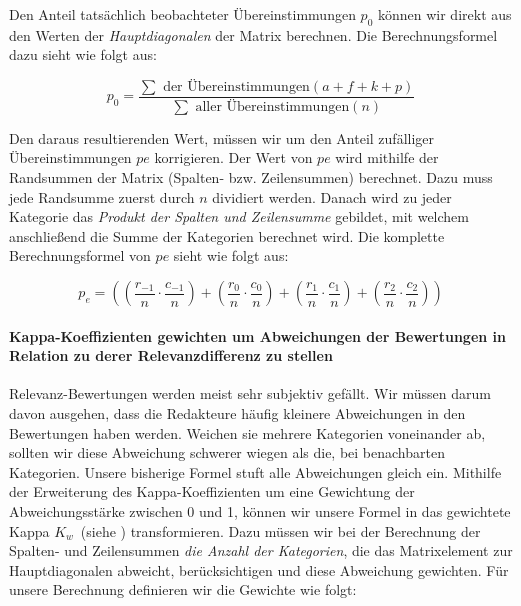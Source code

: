 Den Anteil tatsächlich beobachteter Übereinstimmungen $p_0$ können wir direkt aus den Werten der \textit{Hauptdiagonalen} der Matrix berechnen. Die Berechnungsformel dazu sieht wie folgt aus: 

\vspace{-1.5em}
\begin{equation}	
	p_0 = \frac{ \sum \text{ der Übereinstimmungen} \left( a + f + k + p \right)}{ \sum \text{ aller Übereinstimmungen} \left( n \right) }
\end{equation}
\vspace{-1em}

Den daraus resultierenden Wert, müssen wir um den Anteil zufälliger Übereinstimmungen $pe$ korrigieren. Der Wert von $pe$ wird mithilfe der Randsummen der Matrix (Spalten- bzw. Zeilensummen) berechnet. Dazu muss jede Randsumme zuerst durch $n$ dividiert werden. Danach wird zu jeder Kategorie das \textit{Produkt der Spalten und Zeilensumme} gebildet, mit welchem anschließend die Summe der Kategorien berechnet wird. Die komplette Berechnungsformel von $pe$ sieht wie folgt aus:

\vspace{-1.5em}
\begin{equation}	
	p_e = \left(  \left(\frac{  r_{-1} }{ n } \cdot \frac{ c_{-1} }{ n } \right) +   \left(\frac{  r_0 }{ n } \cdot \frac{ c_0  }{ n } \right) +   \left(\frac{  r_1 }{ n } \cdot \frac{ c_1 }{ n } \right)  +  \left(\frac{ r_2 }{ n } \cdot \frac{   c_2 }{ n }\right) \right)
\end{equation}
\vspace{-2em}

\paragraph{Kappa-Koeffizienten gewichten um Abweichungen der Bewertungen in Relation zu derer Relevanzdifferenz zu stellen}
Relevanz-Bewertungen werden meist sehr subjektiv gefällt. Wir müssen darum davon ausgehen, dass die Redakteure häufig kleinere Abweichungen in den Bewertungen haben werden. Weichen sie mehrere Kategorien voneinander ab, sollten wir diese Abweichung schwerer wiegen als die, bei benachbarten Kategorien. Unsere bisherige Formel stuft alle Abweichungen gleich ein. Mithilfe der Erweiterung des Kappa-Koeffizienten um eine Gewichtung der Abweichungsstärke zwischen 0 und 1, können wir unsere Formel in das gewichtete Kappa $K_w$~(siehe \cite{KappaWerte}) transformieren. Dazu müssen wir bei der Berechnung der Spalten- und Zeilensummen \textit{die Anzahl der Kategorien}, die das Matrixelement zur Hauptdiagonalen abweicht, berücksichtigen und diese Abweichung gewichten. Für unsere Berechnung definieren wir die Gewichte wie folgt:

